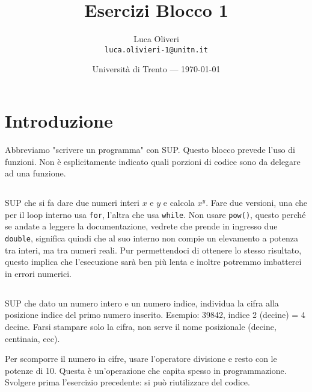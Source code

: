 \documentclass{article}
\title{Esercizi Blocco 1} %
\author{Luca Oliveri\\ \texttt{luca.olivieri-1@unitn.it}} %
\date{Università di Trento --- \today} %
\begin{document}
\maketitle %


\section*{Introduzione} %
Abbreviamo "scrivere un programma" con SUP. Questo blocco prevede l'uso di funzioni. Non è esplicitamente indicato quali porzioni di codice sono da delegare ad una funzione.


\setcounter{section}{1}


\subsection{} 
SUP che si fa dare due numeri interi $x$ e $y$ e calcola $x^y$. Fare due versioni, una che per il loop interno usa \texttt{for}, l'altra che usa \texttt{while}. Non usare \texttt{pow()}, questo perché se andate a leggere la documentazione, vedrete che prende in ingresso due \texttt{double}, significa quindi che al suo interno non compie un elevamento a potenza tra interi, ma tra numeri reali. Pur permettendoci di ottenere lo stesso risultato, questo implica che l'esecuzione sarà ben più lenta e inoltre potremmo imbatterci in errori numerici.


\subsection{}
SUP che dato un numero intero e un numero indice, individua la cifra alla posizione indice del primo numero inserito. Esempio: 39842, indice 2 (decine) = 4 decine. Farsi stampare solo la cifra, non serve il nome posizionale (decine, centinaia, ecc).
\begin{info} 
	Per scomporre il numero in cifre, usare l'operatore divisione e resto con le potenze di 10. Questa è un'operazione che capita spesso in programmazione. Svolgere prima l'esercizio precedente: si può riutilizzare del codice.
\end{info}
\end{document}

